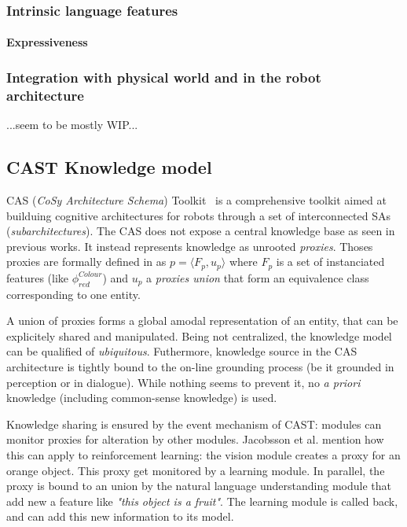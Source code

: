 \documentclass[a4paper, twocolumn]{article}
\begin{document}
\subsubsection{Intrinsic language features}
\label{sect|nkrl-intrinsic-features}

\paragraph{Expressiveness}

\subsubsection{Integration with physical world and in the robot architecture}
\label{sect|nkrl-integration}

...seem to be mostly WIP...


\subsection{CAST Knowledge model}
\label{sect|cast}

CAS (\emph{CoSy Architecture Schema}) Toolkit~\cite{Hawes2007} is a
comprehensive toolkit aimed at builduing cognitive architectures for robots
through a set of interconnected SAs (\emph{subarchitectures}). The CAS does not
expose a central knowledge base as seen in previous works. It instead
represents knowledge as unrooted \emph{proxies}. Thoses proxies are formally
defined in \cite{Jacobsson2008} as $p= \langle F_p, u_p \rangle$ where $F_p$ is
a set of instanciated features (like $\phi^{Colour}_{red}$) and $u_p$ a
\emph{proxies union} that form an equivalence class corresponding to one
entity.

A union of proxies forms a global amodal representation of an entity, that can
be explicitely shared and manipulated. Being not centralized, the knowledge
model can be qualified of \emph{ubiquitous}. Futhermore, knowledge source in
the CAS architecture is tightly bound to the on-line grounding process (be it
grounded in perception or in dialogue). While nothing seems to prevent it, no
{\it a priori} knowledge (including common-sense knowledge) is used.

Knowledge sharing is ensured by the event mechanism of CAST: modules can
monitor proxies for alteration by other modules. Jacobsson et al. mention how
this can apply to reinforcement learning: the vision module creates a proxy for
an orange object. This proxy get monitored by a learning module. In parallel,
the proxy is bound to an union by the natural language understanding module
that add new a feature like \emph{"this object is a fruit"}. The learning
module is called back, and can add this new information to its model.
\end{document}
